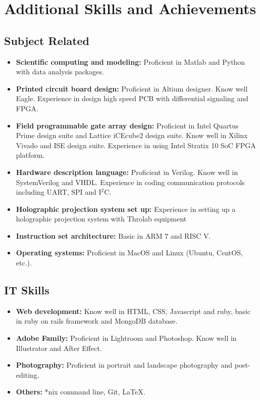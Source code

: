 \documentclass[11pt,a4paper,roman]{moderncv}        %
\begin{document}
\section{Additional Skills and Achievements}
\subsection{Subject Related}
\begin{itemize}
	\item \textbf{Scientific computing and modeling:} Proficient in Matlab and Python with data analysis packages.
	\item \textbf{Printed circuit board design:} Proficient in Altium designer. Know well Eagle. Experience in design high speed PCB with differential signaling and FPGA.
	\item \textbf{Field programmable gate array design:} Proficient in Intel Quartus Prime design suite and Lattice iCEcube2 design suite. Know well in Xilinx Vivado and ISE design suite. Experience in using Intel Stratix 10 SoC FPGA platform.
	\item \textbf{Hardware description language:} Proficient in Verilog. Know well in SystemVerilog and VHDL. Experience in coding communication protocols including UART, SPI and I$^2$C.
	\item \textbf{Holographic projection system set up:} Experience in setting up a holographic projection system with Throlab equipment
	\item \textbf{Instruction set architecture:} Basic in ARM 7 and RISC V.
	\item \textbf{Operating systems:} Proficient in MacOS and Linux (Ubuntu, CentOS, etc.).
\end{itemize}
\subsection{IT Skills}
\begin{itemize}
	\item \textbf{Web development:} Know well in HTML, CSS, Javascript and ruby, basic in ruby on rails framework and MongoDB database.
	\item \textbf{Adobe Family:} Proficient in Lightroom and Photoshop. Know well in Illustrator and After Effect.
	\item \textbf{Photography:} Proficient in portrait and landscape photography and post-editing.
	\item \textbf{Others:} *nix command line, Git, \LaTeX.
\end{itemize}
\end{document}
